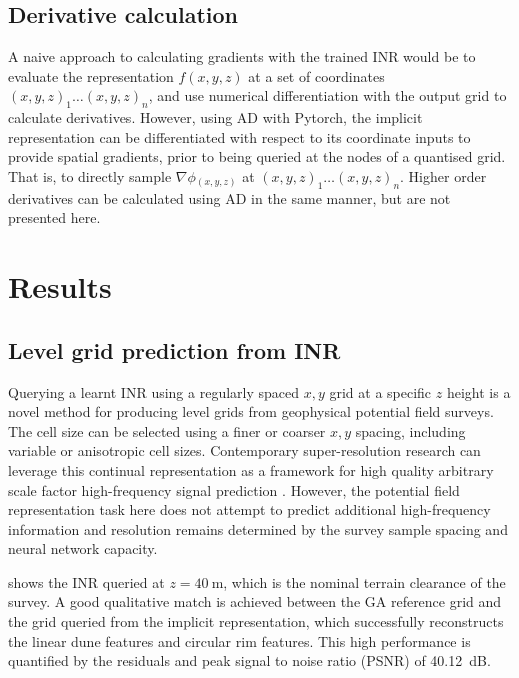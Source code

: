 \documentclass[manuscript.tex]{subfiles}
\begin{document}
\subsection{Derivative calculation}
A naive approach to calculating gradients with the trained INR would be to evaluate the representation \(f(x, y, z)\) at a set of coordinates \({(x, y, z)}_1 \dots {(x,y,z)}_n\), and use numerical differentiation with the output grid to calculate derivatives.
However, using AD with Pytorch, the implicit representation can be differentiated with respect to its coordinate inputs to provide spatial gradients, prior to being queried at the nodes of a quantised grid.
That is, to directly sample \(\nabla{}\phi{}_{(x,y,z)}\) at \({(x, y, z)}_1 \dots {(x,y,z)}_n\).
Higher order derivatives can be calculated using AD in the same manner, but are not presented here.

\section{Results}
\subsection{Level grid prediction from INR}
Querying a learnt INR using a regularly spaced \(x,y\) grid at a specific \(z\) height is a novel method for producing level grids from geophysical potential field surveys.
The cell size can be selected using a finer or coarser \(x,y\) spacing, including variable or anisotropic cell sizes.
Contemporary super-resolution research can leverage this continual representation as a framework for high quality arbitrary scale factor high-frequency signal prediction \parencite[e.g][]{chenLearningContinuousImage2021}.
However, the potential field representation task here does not attempt to predict additional high-frequency information and resolution remains determined by the survey sample spacing and neural network capacity.

 shows the INR queried at \(z=\qty{40}{\m}\), which is the nominal terrain clearance of the survey.
A good qualitative match is achieved between the GA reference grid and the grid queried from the implicit representation, which successfully reconstructs the linear dune features and circular rim features.
This high performance is quantified by the residuals and peak signal to noise ratio (PSNR) of \qty{40.12}{\dB}.
\end{document}
